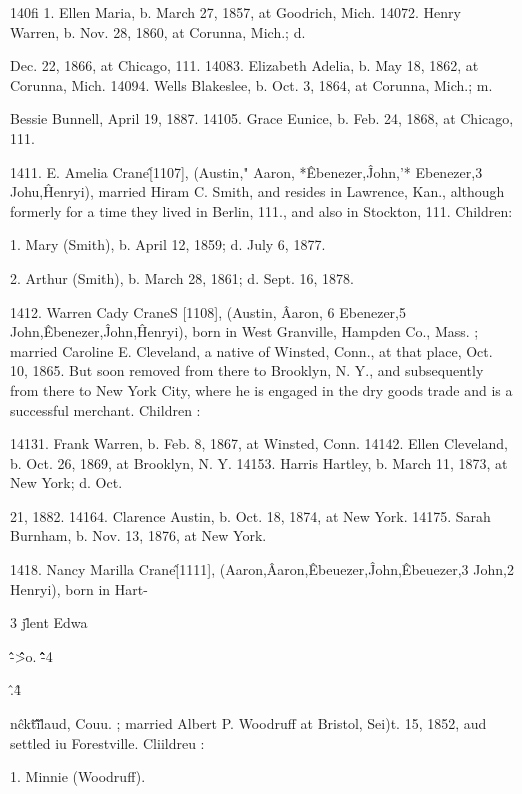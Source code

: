 \documentclass{book}
\begin{document}
140fi 1. Ellen Maria, b. March 27, 1857, at Goodrich, Mich. 
14072. Henry Warren, b. Nov. 28, 1860, at Corunna, Mich.; d. 

Dec. 22, 1866, at Chicago, 111. 
14083. Elizabeth Adelia, b. May 18, 1862, at Corunna, Mich. 
14094. Wells Blakeslee, b. Oct. 3, 1864, at Corunna, Mich.; m. 

Bessie Bunnell, April 19, 1887. 
14105. Grace Eunice, b. Feb. 24, 1868, at Chicago, 111. 

1411. E. Amelia Crane\^ [1107], (Austin," Aaron, *\^Ebenezer,\^ 
John,'* Ebenezer,3 Johu,\^ Henryi), married Hiram C. Smith, and 
resides in Lawrence, Kan., although formerly for a time they lived 
in Berlin, 111., and also in Stockton, 111. Children: 

1. Mary (Smith), b. April 12, 1859; d. July 6, 1877. 

2. Arthur (Smith), b. March 28, 1861; d. Sept. 16, 1878. 

1412. Warren Cady CraneS [1108], (Austin, \^ Aaron, 6 
Ebenezer,5 John,\^ Ebenezer,\^ John,\^ Henryi), born in West 
Granville, Hampden Co., Mass. ; married Caroline E. Cleveland, 
a native of Winsted, Conn., at that place, Oct. 10, 1865. But 
soon removed from there to Brooklyn, N. Y., and subsequently 
from there to New York City, where he is engaged in the dry 
goods trade and is a successful merchant. Children : 

14131. Frank Warren, b. Feb. 8, 1867, at Winsted, Conn. 
14142. Ellen Cleveland, b. Oct. 26, 1869, at Brooklyn, N. Y. 
14153. Harris Hartley, b. March 11, 1873, at New York; d. Oct. 

21, 1882. 
14164. Clarence Austin, b. Oct. 18, 1874, at New York. 
14175. Sarah Burnham, b. Nov. 13, 1876, at New York. 

1418. Nancy Marilla Crane\^ [1111], (Aaron,\^ Aaron,\^ 
Ebeuezer,\^ John,\^ Ebeuezer,3 John,2 Henryi), born in Hart- 




3 j\^lent Edwa 



\^\^-\^\^\^>o. \^\^\^\^\^-4 



\^.\^4 



n\^ck\^t\^\^\^i\^ 




laud, Couu. ; married Albert P. Woodruff at Bristol, Sei)t. 15, 
1852, aud settled iu Forestville. Cliildreu : 

1. Minnie (Woodruff). 
\end{document}
